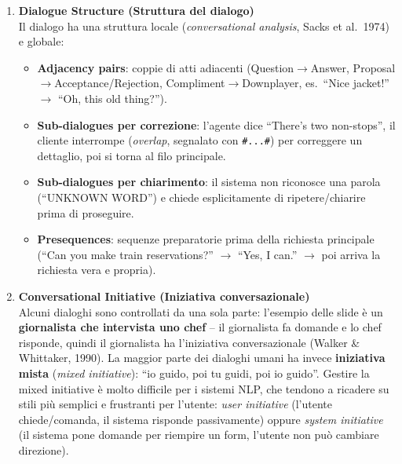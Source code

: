 \documentclass[12pt,a4paper]{article}
\begin{document}
\begin{enumerate}[leftmargin=1.5em, label=\textbf{\arabic*.}]
  \item \textbf{Dialogue Structure (Struttura del dialogo)}\\
    Il dialogo ha una struttura locale (\emph{conversational analysis}, Sacks et al.\ 1974) e globale:
    \begin{itemize}[leftmargin=1.5em, nosep]
      \item \textbf{Adjacency pairs}: coppie di atti adiacenti (Question$\to$Answer, Proposal$\to$Acceptance/Rejection, Compliment$\to$Downplayer, es.\ ``Nice jacket!'' $\to$ ``Oh, this old thing?'').
      \item \textbf{Sub-dialogues per correzione}: l'agente dice ``There's two non-stops'', il cliente interrompe (\emph{overlap}, segnalato con \texttt{\#...\#}) per correggere un dettaglio, poi si torna al filo principale.
      \item \textbf{Sub-dialogues per chiarimento}: il sistema non riconosce una parola (``UNKNOWN WORD'') e chiede esplicitamente di ripetere/chiarire prima di proseguire.
      \item \textbf{Presequences}: sequenze preparatorie prima della richiesta principale (``Can you make train reservations?'' $\to$ ``Yes, I can.'' $\to$ poi arriva la richiesta vera e propria).
    \end{itemize}

  \item \textbf{Conversational Initiative (Iniziativa conversazionale)}\\
    Alcuni dialoghi sono controllati da una sola parte: l'esempio delle slide è un \textbf{giornalista che intervista uno chef} -- il giornalista fa domande e lo chef risponde, quindi il giornalista ha l'iniziativa conversazionale (Walker \& Whittaker, 1990). La maggior parte dei dialoghi umani ha invece \textbf{iniziativa mista} (\emph{mixed initiative}): ``io guido, poi tu guidi, poi io guido''. Gestire la mixed initiative è molto difficile per i sistemi NLP, che tendono a ricadere su stili più semplici e frustranti per l'utente: \emph{user initiative} (l'utente chiede/comanda, il sistema risponde passivamente) oppure \emph{system initiative} (il sistema pone domande per riempire un form, l'utente non può cambiare direzione).


\end{enumerate}
\end{document}
